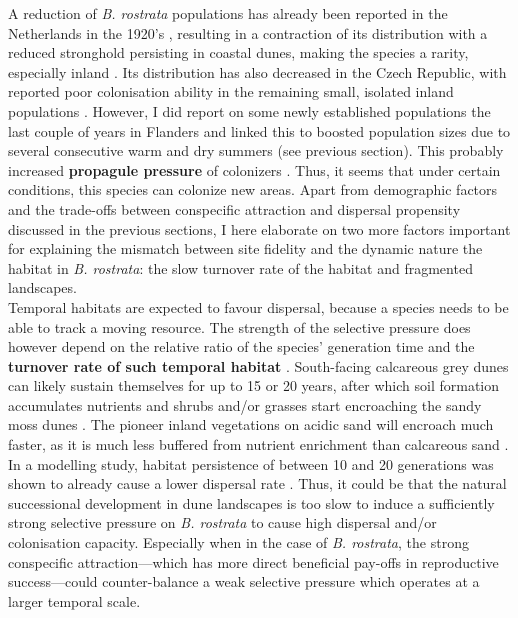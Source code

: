 \documentclass[10pt, twoside]{book} %
\begin{document}
	A reduction of \textit{B. rostrata} populations has already been reported in the Netherlands in the 1920's \citep{pinkhof1924, thijsse1924}, resulting in a contraction of its distribution with a reduced stronghold persisting in coastal dunes, making the species a rarity, especially inland \citep{klein2004}. Its distribution has also decreased in the Czech Republic, with reported poor colonisation ability in the remaining small, isolated inland populations \citep{bogusch2021}. However, I did report on some newly established populations the last couple of years in Flanders and linked this to boosted population sizes due to several consecutive warm and dry summers (see previous section). This probably increased \textbf{propagule pressure} of colonizers \citep{lockwood2005, chase2022}. Thus, it seems that under certain conditions, this species can colonize new areas. Apart from demographic factors and the trade-offs between conspecific attraction and dispersal propensity discussed in the previous sections, I here elaborate on two more factors important for explaining the mismatch between site fidelity and the dynamic nature the habitat in \textit{B. rostrata}: the slow turnover rate of the habitat and fragmented landscapes.\\
	
	Temporal habitats are expected to favour dispersal, because a species needs to be able to track a moving resource. The strength of the selective pressure does however depend on the relative ratio of the species' generation time and the \textbf{turnover rate of such temporal habitat} \citep{travis1999}. South-facing calcareous grey dunes can likely sustain themselves for up to 15 or 20 years, after which soil formation accumulates nutrients and shrubs and/or grasses start encroaching the sandy moss dunes \citep{provoost2004, provoost2004a}. The pioneer inland vegetations on acidic sand will encroach much faster, as it is much less buffered from nutrient enrichment than calcareous sand \citep{provoost2004, schneiders2021}. In a modelling study, habitat persistence of between 10 and 20 generations was shown to already cause a lower dispersal rate \citep{travis1999}. Thus, it could be that the natural successional development in dune landscapes is too slow to induce a sufficiently strong selective pressure on \textit{B. rostrata} to cause high dispersal and/or colonisation capacity. Especially when in the case of \textit{B. rostrata}, the strong conspecific attraction---which has more direct beneficial pay-offs in reproductive success---could counter-balance a weak selective pressure which operates at a larger temporal scale.\\
	
\end{document}

